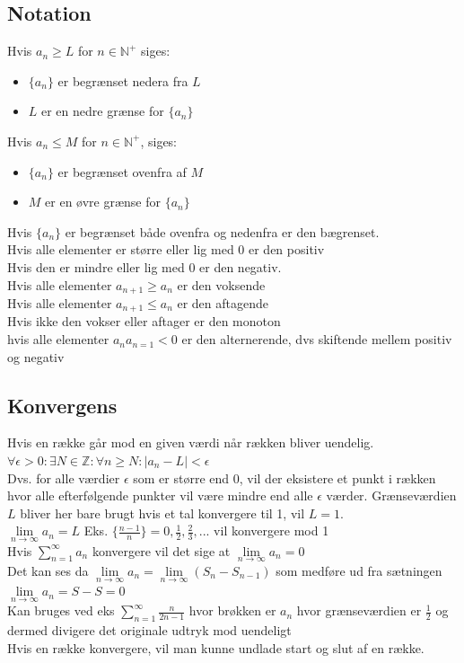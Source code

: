 \documentclass[12pt, a4paper]{article}
\begin{document}
	\subsection{Notation}
		Hvis $a_n \geq L$ for $n\in\mathbb{N}^+$ siges:
		\begin{itemize}
			\item $\{a_n\}$ er begrænset nedera fra $L$
			\item $L$ er en nedre grænse for $\{a_n\}$
		\end{itemize}
		Hvis $a_n \leq M$ for $n\in\mathbb{N}^+$, siges:
		\begin{itemize}
			\item $\{a_n\}$ er begrænset ovenfra af $M$
			\item $M$ er en øvre grænse for $\{a_n\}$
		\end{itemize}
		Hvis $\{a_n\}$ er begrænset både ovenfra og nedenfra er den bægrenset.\\[4mm]
		Hvis alle elementer er større eller lig med 0 er den positiv\\
		Hvis den er mindre eller lig med 0 er den negativ.\\
		Hvis alle elementer $a_{n+1}\geq a_n$ er den voksende\\
		Hvis alle elementer $a_{n+1}\leq a_n$ er den aftagende\\
		Hvis ikke den vokser eller aftager er den monoton\\
		hvis alle elementer $a_na_{n=1}<0$ er den alternerende, dvs skiftende mellem positiv og negativ
	\subsection{Konvergens}
		Hvis en række går mod en given værdi når rækken bliver uendelig.\\
		$\forall \epsilon > 0: \exists N \in \mathbb{Z}:\forall n \geq N: |a_n-L|<\epsilon$\\
		Dvs. for alle værdier $\epsilon$ som er større end 0, vil der eksistere et punkt i rækken hvor alle efterfølgende punkter vil være mindre end alle $\epsilon$ værder. Grænseværdien $L$ bliver her bare brugt hvis et tal konvergere til 1, vil $L=1$.\\
		$\lim\limits_{n\rightarrow\infty} a_n=L$
		Eks. $\{\frac{n-1}{n}\}=0,\frac{1}{2},\frac{2}{3},...$ vil konvergere mod 1\\[4mm]
		Hvis $\sum\limits_{n=1}^{\infty}a_n$ konvergere vil det sige at $\lim\limits_{n\rightarrow \infty}a_n=0$\\
		Det kan ses da $\lim\limits_{n\rightarrow \infty}a_n=\lim\limits_{n\rightarrow\infty}(S_n-S_{n-1})$ som medføre ud fra sætningen $\lim\limits_{n\rightarrow \infty}a_n=S-S=0$\\
		Kan bruges ved eks $\sum\limits_{n=1}^{\infty}\frac{n}{2n-1}$ hvor brøkken er $a_n$ hvor grænseværdien er $\frac{1}{2}$ og dermed divigere det originale udtryk mod uendeligt\\[4mm]
		Hvis en række konvergere, vil man kunne undlade start og slut af en række.
\end{document}
